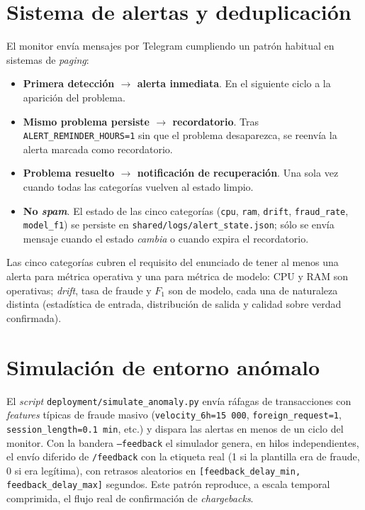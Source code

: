 \documentclass[12pt,a4paper]{report}
\begin{document}
\section{Sistema de alertas y deduplicación}
\label{sec:hito5-alertas}

El monitor envía mensajes por Telegram cumpliendo un patrón habitual en sistemas de \textit{paging}:

\begin{itemize}
    \item \textbf{Primera detección $\rightarrow$ alerta inmediata}. En el siguiente ciclo a la aparición del problema.
    \item \textbf{Mismo problema persiste $\rightarrow$ recordatorio}. Tras \texttt{ALERT\_REMINDER\_HOURS=1} sin que el problema desaparezca, se reenvía la alerta marcada como recordatorio.
    \item \textbf{Problema resuelto $\rightarrow$ notificación de recuperación}. Una sola vez cuando todas las categorías vuelven al estado limpio.
    \item \textbf{No \textit{spam}}. El estado de las cinco categorías (\texttt{cpu}, \texttt{ram}, \texttt{drift}, \texttt{fraud\_rate}, \texttt{model\_f1}) se persiste en \texttt{shared/logs/alert\_state.json}; sólo se envía mensaje cuando el estado \textit{cambia} o cuando expira el recordatorio.
\end{itemize}

Las cinco categorías cubren el requisito del enunciado de tener al menos una alerta para métrica operativa y una para métrica de modelo: CPU y RAM son operativas; \textit{drift}, tasa de fraude y $F_1$ son de modelo, cada una de naturaleza distinta (estadística de entrada, distribución de salida y calidad sobre verdad confirmada).

\section{Simulación de entorno anómalo}
\label{sec:hito5-simulacion}

El \textit{script} \texttt{deployment/simulate\_anomaly.py} envía ráfagas de transacciones con \textit{features} típicas de fraude masivo (\texttt{velocity\_6h=15\,000}, \texttt{foreign\_request=1}, \texttt{session\_length=0.1\,min}, etc.) y dispara las alertas en menos de un ciclo del monitor. Con la bandera \texttt{--feedback} el simulador genera, en hilos independientes, el envío diferido de \texttt{/feedback} con la etiqueta real (1 si la plantilla era de fraude, 0 si era legítima), con retrasos aleatorios en \texttt{[feedback\_delay\_min, feedback\_delay\_max]} segundos. Este patrón reproduce, a escala temporal comprimida, el flujo real de confirmación de \textit{chargebacks}.
\end{document}
